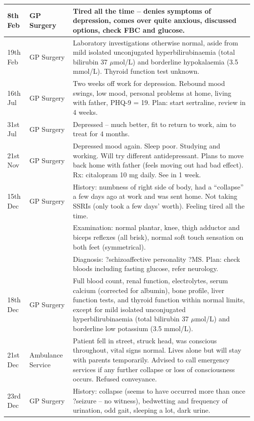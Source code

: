 \begin{longtable}{
  >{\raggedright\arraybackslash}p{3.0cm}
  >{\raggedright\arraybackslash}p{3.3cm}
  >{\raggedright\arraybackslash}p{9.2cm}
}
8th Feb & GP Surgery
& Tired all the time – denies symptoms of depression, comes over quite anxious, discussed options, check FBC and glucose. \\
\midrule
19th Feb & GP Surgery
& Laboratory investigations otherwise normal, aside from mild isolated unconjugated hyperbilirubinaemia (total bilirubin 37 $\mu$mol/L) and borderline hypokalaemia (3.5 mmol/L). Thyroid function test unknown. \\
\midrule
16th Jul & GP Surgery
& Two weeks off work for depression. Rebound mood swings, low mood, personal problems at home, living with father, PHQ-9 = 19. Plan: start sertraline, review in 4 weeks. \\
\midrule
31st Jul & GP Surgery
& Depressed – much better, fit to return to work, aim to treat for 4 months. \\
\midrule
21st Nov & GP Surgery
& Depressed mood again. Sleep poor. Studying and working. Will try different antidepressant. Plans to move back home with father (feels moving out had bad effect). Rx: citalopram 10 mg daily. See in 1 week. \\
\midrule
15th Dec & GP Surgery
& History: numbness of right side of body, had a “collapse” a few days ago at work and was sent home. Not taking SSRIs (only took a few days’ worth). Feeling tired all the time. \\
& & Examination: normal plantar, knee, thigh adductor and biceps reflexes (all brisk), normal soft touch sensation on both feet (symmetrical). \\
& & Diagnosis: ?schizoaffective personality ?MS. Plan: check bloods including fasting glucose, refer neurology. \\
\midrule
18th Dec & GP Surgery
& Full blood count, renal function, electrolytes, serum calcium (corrected for albumin), bone profile, liver function tests, and thyroid function within normal limits, except for mild isolated unconjugated hyperbilirubinaemia (total bilirubin 37 $\mu$mol/L) and borderline low potassium (3.5 mmol/L). \\
\midrule
21st Dec & Ambulance Service
& Patient fell in street, struck head, was conscious throughout, vital signs normal. Lives alone but will stay with parents temporarily. Advised to call emergency services if any further collapse or loss of consciousness occurs. Refused conveyance. \\
\midrule
23rd Dec & GP Surgery
& History: collapse (seems to have occurred more than once ?seizure – no witness), bedwetting and frequency of urination, odd gait, sleeping a lot, dark urine. \\

\end{longtable}

